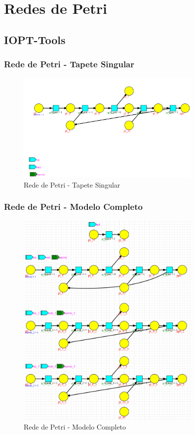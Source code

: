 \section{Redes de Petri}

\subsection{IOPT-Tools}

\subsubsection{Rede de Petri - Tapete Singular}
\begin{figure}[H]
    \centering
    \includegraphics[width=0.8\textwidth]{img/petri_tapete_singular.png}
    \caption{Rede de Petri - Tapete Singular}
    \label{fig:petri_tapete_singular}
\end{figure}

\subsubsection{Rede de Petri - Modelo Completo}
\begin{figure}[H]
    \centering
    \includegraphics[width=0.8\textwidth]{img/petri_modelo_completo.png}
    \caption{Rede de Petri - Modelo Completo}
    \label{fig:petri_modelo_completo}
\end{figure}

